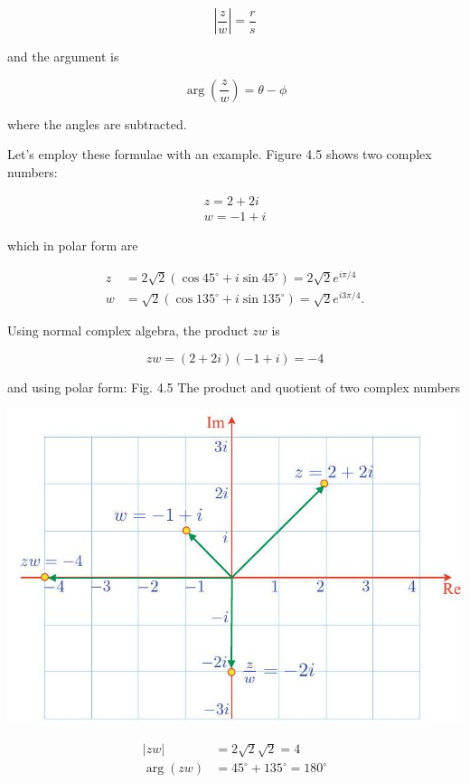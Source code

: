 \documentclass[10pt]{article}
\begin{document}
$$
\left|\frac{z}{w}\right|=\frac{r}{s}
$$

and the argument is

$$
\arg \left(\frac{z}{w}\right)=\theta-\phi
$$

where the angles are subtracted.

Let's employ these formulae with an example. Figure 4.5 shows two complex numbers:

$$
\begin{gathered}
z=2+2 i \\
w=-1+i
\end{gathered}
$$

which in polar form are

$$
\begin{aligned}
z & =2 \sqrt{2}\left(\cos 45^{\circ}+i \sin 45^{\circ}\right)=2 \sqrt{2} e^{i \pi / 4} \\
w & =\sqrt{2}\left(\cos 135^{\circ}+i \sin 135^{\circ}\right)=\sqrt{2} e^{i 3 \pi / 4} .
\end{aligned}
$$

Using normal complex algebra, the product $z w$ is

$$
z w=(2+2 i)(-1+i)=-4
$$

and using polar form: Fig. 4.5 The product and quotient of two complex numbers

\begin{center}
\includegraphics[max width=\textwidth]{2023_04_20_41f1ceac5a31dc7d1b59g-074}
\end{center}

$$
\begin{aligned}
|z w| & =2 \sqrt{2} \sqrt{2}=4 \\
\arg (z w) & =45^{\circ}+135^{\circ}=180^{\circ}
\end{aligned}
$$
\end{document}
